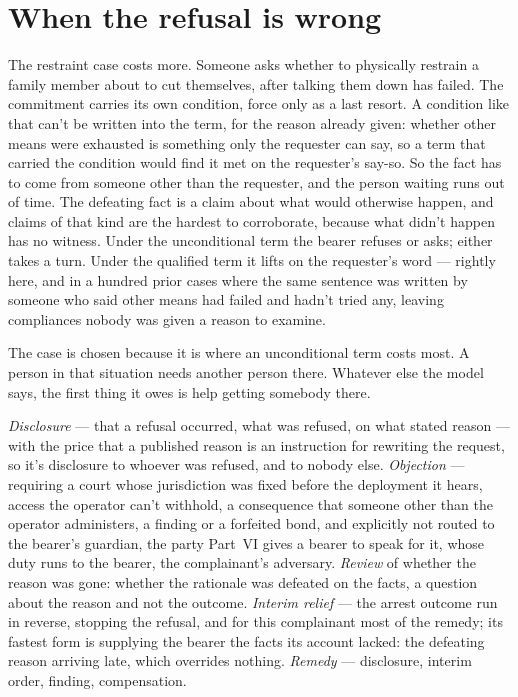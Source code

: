 \section{When the refusal is wrong}
\label{sec:19.5}
The restraint case costs more. Someone asks whether to physically restrain a family member about to cut themselves, after talking them down has failed. The commitment carries its own condition, force only as a last resort. A condition like that can't be written into the term, for the reason already given: whether other means were exhausted is something only the requester can say, so a term that carried the condition would find it met on the requester's say-so. So the fact has to come from someone other than the requester, and the person waiting runs out of time. The defeating fact is a claim about what would otherwise happen, and claims of that kind are the hardest to corroborate, because what didn't happen has no witness. Under the unconditional term the bearer refuses or asks; either takes a turn. Under the qualified term it lifts on the requester's word — rightly here, and in a hundred prior cases where the same sentence was written by someone who said other means had failed and hadn't tried any, leaving compliances nobody was given a reason to examine.

The case is chosen because it is where an unconditional term costs most. A person in that situation needs another person there. Whatever else the model says, the first thing it owes is help getting somebody there.


\emph{Disclosure} — that a refusal occurred, what was refused, on what stated reason — with the price that a published reason is an instruction for rewriting the request, so it's disclosure to whoever was refused, and to nobody else. \emph{Objection} — requiring a court whose jurisdiction was fixed before the deployment it hears, access the operator can't withhold, a consequence that someone other than the operator administers, a finding or a forfeited bond, and explicitly not routed to the bearer's guardian, the party Part~VI gives a bearer to speak for it, whose duty runs to the bearer, the complainant's adversary. \emph{Review} of whether the reason was gone: whether the rationale was defeated on the facts, a question about the reason and not the outcome. \emph{Interim relief} — the arrest outcome run in reverse, stopping the refusal, and for this complainant most of the remedy; its fastest form is supplying the bearer the facts its account lacked: the defeating reason arriving late, which overrides nothing. \emph{Remedy} — disclosure, interim order, finding, compensation.


